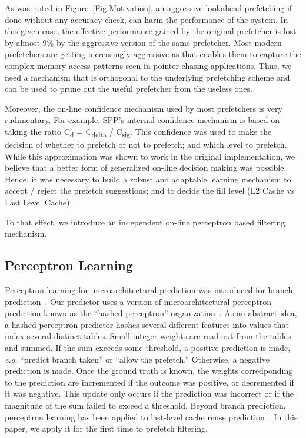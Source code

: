 
As was noted in Figure~\ref{Fig:Motivation}, an aggressive lookahead 
prefetching if done without any accuracy check, can harm the performance 
of the system. In this given case, the effective performance gained
by the original prefetcher is lost by almost 9\% by the aggressive version 
of the same prefetcher. Most modern prefetchers are getting increasingly 
aggressive as that enables them to capture the complex memory access patterns 
seen in pointer-chasing applications. Thus, we need a mechanism that is 
orthogonal to the underlying prefetching scheme and can be used
to prune out the useful prefetcher from the useless ones. 

Moreover, the on-line confidence mechanism used by most prefetchers is very
rudimentary. For example, SPP's internal confidence mechanism is based on taking 
the ratio C\textsubscript{d} = C\textsubscript{delta} / C\textsubscript{sig}.
This confidence was used to make the decision of whether to prefetch or not to
prefetch; and which level to prefetch.  While this approximation was shown to
work in the original implementation, we believe that a better form of
generalized on-line decision making was possible.  Hence, it was necessary to
build a robust and adaptable learning mechanism to accept / reject the
prefetch suggestions; and to decide the fill level (L2 Cache vs Last Level
Cache).

To that effect, we introduce an independent on-line perceptron based
filtering mechanism.

\subsection{Perceptron Learning}
\label{sec:Background-Perceptron}
Perceptron learning for microarchitectural prediction was introduced for
branch prediction~\cite{PerceptronPredictor}. Our predictor uses a version of
microarchitectural perceptron prediction known as the ``hashed perceptron''
organization~\cite{HashedPerceptron}. As an abstract idea, a hashed perceptron
predictor hashes several different features into values that index several
distinct tables. Small integer weights are read out from the tables and
summed. If the sum exceeds some threshold, a positive prediction is made, {\em
e.g.} ``predict branch taken'' or ``allow the prefetch.'' Otherwise, a
negative prediction is made. Once the ground truth is known, the weights
corredponding to the prediction are incremented if the outcome was positive,
or decremented if it was negative. This update only occurs if the prediction
was incorrect or if the magnitude of the sum failed to exceed a threshold.
Beyond branch prediction, perceptron learning has been applied to last-level
cache reuse prediction~\cite{Perc_Reuse,Multiperspective}. In this paper, we
apply it for the first time to prefetch filtering.

